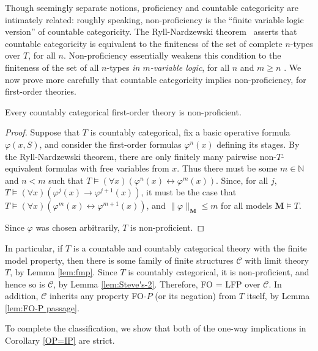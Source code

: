 \documentclass{lmcs}
\newcommand{\M}{\mathbf{M}}
\theoremstyle{thmC}
\begin{document}
Though seemingly separate notions, proficiency and countable categoricity are intimately related: roughly speaking, non-proficiency is the ``finite variable logic version'' of countable categoricity. The Ryll-Nardzewski theorem~\cite[Theorem 7.3.1]{Hodges} asserts that countable categoricity is equivalent to  the finiteness of the set of complete $n$-types over $T$, for all $n$. Non-proficiency essentially weakens this condition to the finiteness of the set of all $n$-types \emph{in $m$-variable logic}, for all $n$ and $m \ge n$ \cite[Theorem 23]{DLW}. We now prove more carefully that countable categoricity implies non-proficiency, for first-order theories.

\begin{lem}\label{lem:countable categoricity}
Every countably categorical first-order theory is non-proficient.
\end{lem}

\begin{proof}
Suppose that $T$ is countably categorical, fix a basic operative formula $\varphi(x,S)$, and consider the first-order formulas $\varphi^n(x)$ defining its stages. By the Ryll-Nardzewski theorem, there are only finitely many pairwise non-$T$-equivalent formulas with free variables from $x$. Thus there must be some $m \in \mathbb{N}$ and $n < m$ such that $T \models (\forall x)(\varphi^n(x) \leftrightarrow \varphi^m(x))$. Since, for all $j$, $T \models (\forall x)(\varphi^j(x) \rightarrow \varphi^{j+1}(x))$, it must be the case that $T \models  (\forall x)(\varphi^m(x) \leftrightarrow \varphi^{m+1}(x))$, and $\|\varphi\|_\M \leq m$ for all models $\M\models T$.

Since $\varphi$ was chosen arbitrarily, $T$ is non-proficient.
\end{proof}

\begin{rem}\label{rem:ccfmp}
In particular, if $T$ is a countable and countably categorical theory with the finite model property, then there is some family of finite structures $\mathcal{C}$ with limit theory $T$, by Lemma \ref{lem:fmp}. Since $T$ is countably categorical, it is non-proficient, and hence so is $\mathcal{C}$, by Lemma \ref{lem:Steve's-2}. Therefore, FO = LFP over $\mathcal{C}$. In addition, $\mathcal{C}$ inherits any property FO-$P$ (or its negation) from $T$ itself, by Lemma \ref{lem:FO-P passage}.
\end{rem}

To complete the classification, we show that both of the one-way implications in Corollary \ref{OP=IP} are strict.
\end{document}

